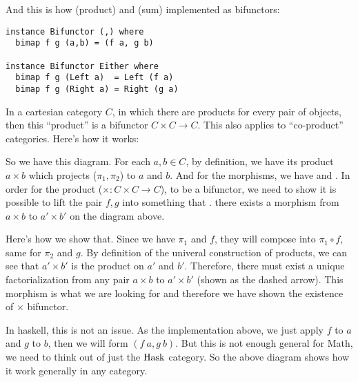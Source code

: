 And this is how \code{(,)} (product) and  (sum) implemented as bifunctors:

\begin{lstlisting}
instance Bifunctor (,) where
  bimap f g (a,b) = (f a, g b)

instance Bifunctor Either where
  bimap f g (Left a)  = Left (f a)
  bimap f g (Right a) = Right (g a)
\end{lstlisting}

In a cartesian category $C$, in which there are products for every pair of
objects, then this ``product'' is a bifunctor $C\times C \to C$. This also
applies to ``co-product'' categories. Here's how it works:

\begin{center}
\end{center}

So we have this diagram. For each $a, b \in C$, by definition, we have its
product $a\times b$ which projects ($\pi_1, \pi_2$) to $a$ and $b$. And for the
morphisms, we have  and . In order for
the product ($\times : C\times C \to C$), to be a bifunctor, we need to show it
is possible to lift the pair $f, g$ into something that
. \ie there exists a
morphism from $a\times b$ to $a'\times b'$ on the diagram above.

\begin{center}
\end{center}

Here's how we show that. Since we have $\pi_1$ and $f$, they will compose into
$\pi_1 \circ f$, same for $\pi_2$ and $g$. By definition of the univeral
construction of products, we can see
that $a'\times b'$ is the product on $a'$ and $b'$. Therefore, there must exist a unique
factorialization from any pair $a\times b$ to $a'\times b'$ (shown as the dashed arrow).
This morphism is what we are looking for and therefore we have shown the
existence of $\times$ bifunctor.

In haskell, this is not an issue. As the implementation above, we just apply $f$
to $a$ and $g$ to $b$, then we will form $(f~a, g~b)$. But this is not enough
general for Math, we need to think out of just the $\mathrm{Hask}$ category. So the
above diagram shows how it work generally in any category.